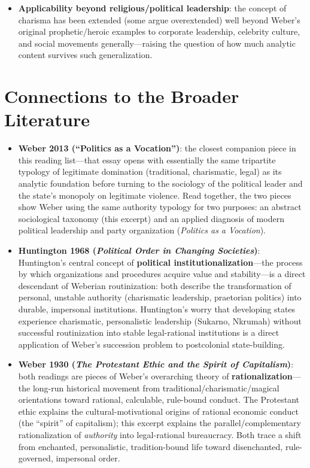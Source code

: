 \documentclass[12pt]{article}
\begin{document}
\begin{itemize}[leftmargin=*, itemsep=4pt]
    \item \textbf{Applicability beyond religious/political leadership}: the concept of charisma has been extended (some argue overextended) well beyond Weber's original prophetic/heroic examples to corporate leadership, celebrity culture, and social movements generally---raising the question of how much analytic content survives such generalization.
\end{itemize}

\section{Connections to the Broader Literature}

\begin{itemize}[leftmargin=*, itemsep=4pt]
    \item \textbf{Weber 2013 (``Politics as a Vocation'')}: the closest companion piece in this reading list---that essay opens with essentially the same tripartite typology of legitimate domination (traditional, charismatic, legal) as its analytic foundation before turning to the sociology of the political leader and the state's monopoly on legitimate violence. Read together, the two pieces show Weber using the same authority typology for two purposes: an abstract sociological taxonomy (this excerpt) and an applied diagnosis of modern political leadership and party organization (\textit{Politics as a Vocation}).
    \item \textbf{Huntington 1968 (\textit{Political Order in Changing Societies})}: Huntington's central concept of \textbf{political institutionalization}---the process by which organizations and procedures acquire value and stability---is a direct descendant of Weberian routinization: both describe the transformation of personal, unstable authority (charismatic leadership, praetorian politics) into durable, impersonal institutions. Huntington's worry that developing states experience charismatic, personalistic leadership (Sukarno, Nkrumah) without successful routinization into stable legal-rational institutions is a direct application of Weber's succession problem to postcolonial state-building.
    \item \textbf{Weber 1930 (\textit{The Protestant Ethic and the Spirit of Capitalism})}: both readings are pieces of Weber's overarching theory of \textbf{rationalization}---the long-run historical movement from traditional/charismatic/magical orientations toward rational, calculable, rule-bound conduct. The Protestant ethic explains the cultural-motivational origins of rational economic conduct (the ``spirit'' of capitalism); this excerpt explains the parallel/complementary rationalization of \emph{authority} into legal-rational bureaucracy. Both trace a shift from enchanted, personalistic, tradition-bound life toward disenchanted, rule-governed, impersonal order.

\end{itemize}
\end{document}
